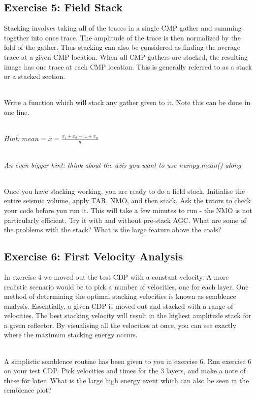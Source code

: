 \subsection*{Exercise 5: Field Stack}
Stacking involves taking all of the traces in a single CMP gather and summing together into once trace.  The amplitude of the trace is then normalized by the fold of the gather.  Thus stacking can also be considered as finding the average trace at a given CMP location.  When all CMP gathers are stacked, the resulting image has one trace at each CMP location.  This is generally referred to as a stack or a stacked section.
\par~\\
Write a function which will stack any gather given to it.  Note this can be done in one line. 
\par~\\
\emph{Hint: $mean = \bar{x} = \frac{x_1 + x_2 + \ldots + x_n}{n}$}
\par~\\
\emph{An even bigger hint: think about the axis you want to use numpy.mean() along}
\par~\\
Once you have stacking working, you are ready to do a field stack.  Initialise the entire seismic volume, apply TAR, NMO, and then stack.  Ask the tutors to check your code before you run it.  This will take a few minutes to run - the NMO is not particularly efficient. Try it with and without pre-stack AGC. What are some of the problems with the stack? What is the large feature above the coals?
  

\subsection*{Exercise 6: First Velocity Analysis}
In exercise 4 we moved out the test CDP with a constant velocity.  A more realistic scenario would be to pick a number of velocities, one for each layer. One method of determining the optimal stacking velocities is known as semblence analysis.  Essentially, a given CDP is moved out and stacked with a range of velocities. The best stacking velocity will result in the highest amplitude stack for a given reflector.  By visualising all the velocities at once, you can see exactly where the maximum stacking energy occurs.
\par~\\
A simplistic semblence routine has been given to you in exercise 6. Run exercise 6 on your test CDP. Pick velocities and times for the 3 layers, and make a note of these for later.  What is the large high energy event which can also be seen in the semblence plot?

